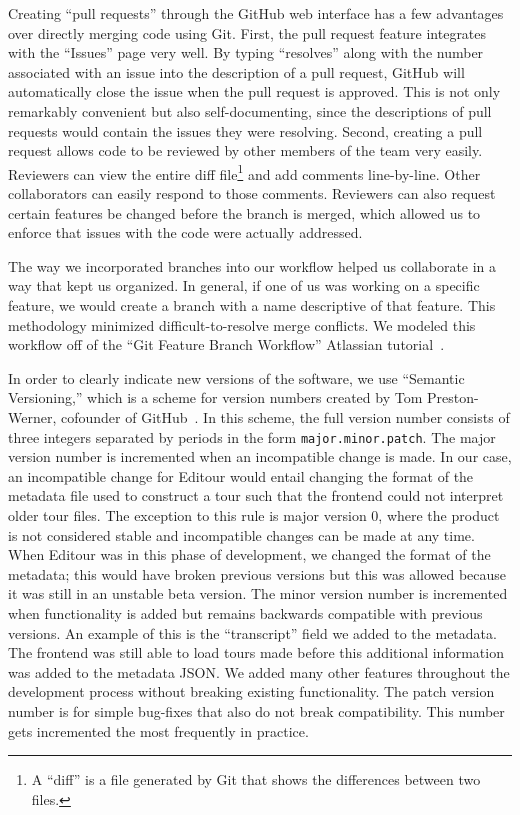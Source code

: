 \documentclass[a4paper, 10pt, american, titlepage]{article}
\begin{document}
Creating ``pull requests'' through the GitHub web interface has a few advantages
over directly merging code using Git. First, the pull request feature integrates
with the ``Issues'' page very well. By typing ``resolves'' along with the number
associated with an issue into the description of a pull request, GitHub will
automatically close the issue when the pull request is approved. This is not
only remarkably convenient but also self-documenting, since the descriptions of
pull requests would contain the issues they were resolving. Second, creating a
pull request allows code to be reviewed by other members of the team very
easily. Reviewers can view the entire diff file\footnote{A ``diff'' is a file
generated by Git that shows the differences between two files.} and add comments
line-by-line. Other collaborators can easily respond to those comments.
Reviewers can also request certain features be changed before the branch is
merged, which allowed us to enforce that issues with the code were actually
addressed.

The way we incorporated branches into our workflow helped us collaborate in a
way that kept us organized. In general, if one of us was working on a specific
feature, we would create a branch with a name descriptive of that feature. This
methodology minimized difficult-to-resolve merge conflicts. We modeled this
workflow off of the ``Git Feature Branch Workflow'' Atlassian
tutorial~\autocite{atlassian}.

In order to clearly indicate new versions of the software, we use ``Semantic
Versioning,'' which is a scheme for version numbers created by Tom
Preston-Werner, cofounder of GitHub~\autocite{prestonwerner}. In this scheme,
the full version number consists of three integers separated by periods in the
form \texttt{major.minor.patch}. The major version number is incremented when an
incompatible change is made. In our case, an incompatible change for Editour
would entail changing the format of the metadata file used to construct a tour
such that the frontend could not interpret older tour files. The exception to
this rule is major version 0, where the product is not considered stable and
incompatible changes can be made at any time. When Editour was in this phase of
development, we changed the format of the metadata; this would have broken
previous versions but this was allowed because it was still in an unstable beta
version. The minor version number is incremented when functionality is added but
remains backwards compatible with previous versions. An example of this is the
``transcript'' field we added to the metadata. The frontend was still able to
load tours made before this additional information was added to the metadata
JSON. We added many other features throughout the development process without
breaking existing functionality. The patch version number is for simple
bug-fixes that also do not break compatibility. This number gets incremented the
most frequently in practice.
\end{document}
